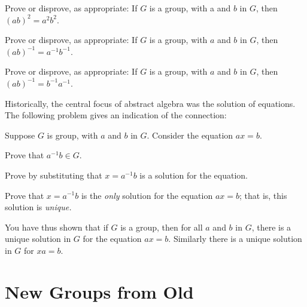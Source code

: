\begin{problem}
Prove or disprove, as appropriate: If \(G\) is a group, with a and \(b\) in \(G\), then \((ab)^2 = a^2b^2\).
\end{problem}

\begin{problem}
Prove or disprove, as appropriate: If \(G\) is a group, with \(a\) and \(b\) in \(G\), then \((ab)^{-1} = a^{-1}b^{-1}\).
\end{problem}

\begin{problem}
Prove or disprove, as appropriate: If \(G\) is a group, with \(a\) and \(b\) in \(G\), then \((ab)^{-1} = b^{-1}a^{-1}\).
\begin{annotation}
\end{annotation}
\end{problem}

Historically, the central focus of abstract algebra was the solution of equations. The following problem gives an indication of the connection:

\begin{problem}\label{prob:existuniquesol}
Suppose \(G\) is group, with \(a\) and \(b\) in \(G\). Consider the equation \(ax = b\).
\begin{problemparts}
  \item Prove that \(a^{-1}b \in G\).
  \item Prove by substituting that \(x = a^{-1}b\) is a solution for the equation.
  \item Prove that \(x = a^{-1}b\) is the \emph{only} solution for the equation \(ax = b\); that is, this solution is \emph{unique.}
\begin{annotation}
\end{annotation}
\end{problemparts}
\end{problem}

You have thus shown that if \(G\) is a group, then for all \(a\) and \(b\) in \(G\), there is a unique solution in \(G\) for the equation \(ax = b\). Similarly there is a unique solution in \(G\) for \(xa = b\).

\chapter{New Groups from Old}\label{chap:newgroups}

